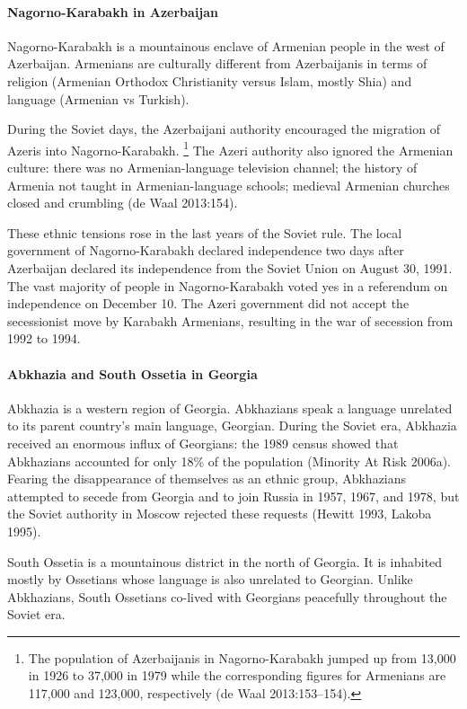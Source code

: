 \documentclass[12pt,a4paper]{article}%
\begin{document}
\paragraph{Nagorno-Karabakh in Azerbaijan}
Nagorno-Karabakh is a mountainous enclave of Armenian people in the west of Azerbaijan. 
Armenians are culturally different from Azerbaijanis in terms of religion (Armenian Orthodox Christianity versus Islam, mostly Shia) and language (Armenian vs Turkish). 

During the Soviet days, the Azerbaijani authority encouraged the migration of Azeris into Nagorno-Karabakh.%
\footnote{
	The population of Azerbaijanis in Nagorno-Karabakh jumped up from 13,000 in 1926 to 37,000 in 1979 while the corresponding figures for Armenians are 117,000 and 123,000, respectively (de Waal 2013:153--154).
	} 
The Azeri authority also ignored the Armenian culture: there was no Armenian-language television channel; the history of Armenia not taught in Armenian-language schools; medieval Armenian churches closed and crumbling (de Waal 2013:154).  

These ethnic tensions rose in the last years of the Soviet rule. 
The local government of Nagorno-Karabakh declared independence two days after Azerbaijan declared its independence from the Soviet Union on August 30, 1991. 
The vast majority of people in Nagorno-Karabakh voted yes in a referendum on independence on December 10. 
The Azeri government did not accept the secessionist move by Karabakh Armenians, resulting in the war of secession from 1992 to 1994.

\paragraph{Abkhazia and South Ossetia in Georgia}
Abkhazia is a western region of Georgia. Abkhazians speak a language unrelated to its parent country's main language, Georgian. 
During the Soviet era, Abkhazia received an enormous influx of Georgians: the 1989 census showed that Abkhazians accounted for only 18\% of the population (Minority At Risk 2006a).
Fearing the disappearance of themselves as an ethnic group, Abkhazians attempted to secede from Georgia and to join Russia in 1957, 1967, and 1978, but the Soviet authority in Moscow rejected these requests (Hewitt 1993, Lakoba 1995).

South Ossetia is a mountainous district in the north of Georgia. 
It is inhabited mostly by Ossetians whose language is also unrelated to Georgian. 
Unlike Abkhazians, South Ossetians co-lived with Georgians peacefully throughout the Soviet era.
\end{document}
